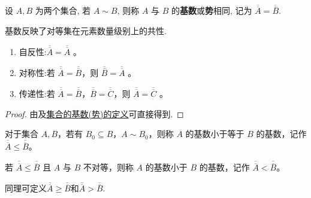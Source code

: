 \documentclass[../../main.tex]{subfiles}%
\begin{document}
\begin{definition}[集合的基数(势)]\label{definition:集合的基数(势)}
设 $A, B$ 为两个集合, 若 $A \sim B$, 则称 $A$ 与 $B$ 的\textbf{基数}或\textbf{势}相同, 记为 $\overline{\overline{A}} = \overline{\overline{B}}$.
\end{definition}
\begin{note}
基数反映了对等集在元素数量级别上的共性. 
\end{note}

\begin{theorem}
\begin{enumerate}[(1)]
\item 自反性:$\overline{\overline{A}} = \overline{\overline{A}}$ 。

\item 对称性:若 $\overline{\overline{A}} = \overline{\overline{B}}$，则 $\overline{\overline{B}} = \overline{\overline{A}}$ 。

\item 传递性:若 $\overline{\overline{A}} = \overline{\overline{B}}$，$\overline{\overline{B}} = \overline{\overline{C}}$，则 $\overline{\overline{A}} = \overline{\overline{C}}$ 。
\end{enumerate}
\end{theorem}
\begin{proof}

由及\hyperref[definition:集合的基数(势)]{集合的基数(势)的定义}可直接得到.

\end{proof}

\begin{definition}\label{definition:集合的基数大小关系}
对于集合 $A, B$，若有 $B_0 \subseteq B$，$A \sim B_0$，则称 $A$ 的基数小于等于 $B$ 的基数，记作 $\overline{\overline{A}} \leqslant\overline{\overline{B}}$。

若 $\overline{\overline{A}}\leqslant \overline{\overline{B}}$ 且 $A$ 与 $B$ 不对等，则称 $A$ 的基数小于 $B$ 的基数，记作 $\overline{\overline{A}} < \overline{\overline{B}}$。

同理可定义$\overline{\overline{A}}\geqslant \overline{\overline{B}}$和$\overline{\overline{A}}> \overline{\overline{B}}$.
\end{definition}
\end{document}
